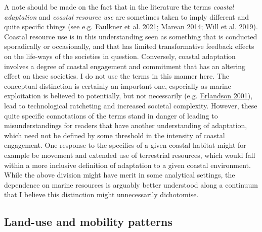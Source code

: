 \documentclass[
  12pt,
  a4paper,
  oneside]{book}
\begin{document}
A note should be made on the fact that in the literature the terms \emph{coastal adaptation} and \emph{coastal resource use} are sometimes taken to imply different and quite specific things (see e.g. \protect\hyperlink{ref-faulkner2021}{Faulkner et al. 2021}; \protect\hyperlink{ref-marean2014}{Marean 2014}; \protect\hyperlink{ref-will2019}{Will et al. 2019}). Coastal resource use is in this understanding seen as something that is conducted sporadically or occasionally, and that has limited transformative feedback effects on the life-ways of the societies in question. Conversely, coastal adaptation involves a degree of coastal engagement and commitment that has an altering effect on these societies. I do not use the terms in this manner here. The conceptual distinction is certainly an important one, especially as marine exploitation is believed to potentially, but not necessarily (e.g. \protect\hyperlink{ref-erlandson2001}{Erlandson 2001}), lead to technological ratcheting and increased societal complexity. However, these quite specific connotations of the terms stand in danger of leading to misunderstandings for readers that have another understanding of adaptation, which need not be defined by some threshold in the intensity of coastal engagement. One response to the specifics of a given coastal habitat might for example be movement and extended use of terrestrial resources, which would fall within a more inclusive definition of adaptation to a given coastal environment. While the above division might have merit in some analytical settings, the dependence on marine resources is arguably better understood along a continuum that I believe this distinction might unnecessarily dichotomise.

\hypertarget{mobility}{%
\subsection{Land-use and mobility patterns}\label{mobility}}
\end{document}
